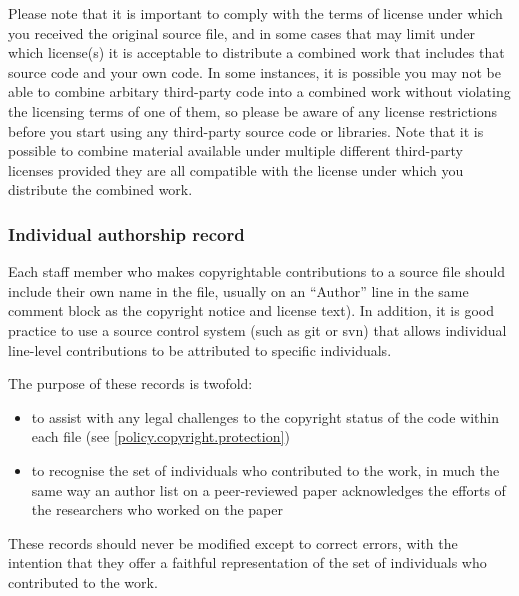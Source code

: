 \documentclass[10pt,a4paper]{article}
\begin{document}
\par Please note that it is important to comply with the terms of license under 
which you received the original source file, and in some cases that may limit 
under which license(s) it is acceptable to distribute a combined work that 
includes that source code and your own code. In some instances, it is possible 
you may not be able to combine arbitary third-party code into a combined work 
without violating the licensing terms of one of them, so please be aware of any 
license restrictions before you start using any third-party source code or libraries. 
Note that it is possible to combine material available under multiple different 
third-party licenses provided they are all compatible \cite{define:compatible} with 
the license under which you distribute the combined work. 



\subsubsection{Individual authorship record}
\label{bestpractice.records}
\par Each staff member who makes copyrightable contributions to a source file 
should include their own name in the file, usually on an ``Author'' line in the 
same comment block as the copyright notice and license text). In addition, it is 
good practice to use a source control system (such as git or svn) that allows 
individual line-level contributions to be attributed to specific individuals. 

\par The purpose of these records is twofold: 
\begin{itemize}
\item to assist with any legal challenges to the copyright status of the code within 
each file (see \ref{policy.copyright.protection})
\item to recognise the set of individuals who contributed to the work, in much the 
same way an author list on a peer-reviewed paper acknowledges the efforts of the 
researchers who worked on the paper
\end{itemize}

\par These records should never be modified except to correct 
errors, with the intention that they offer a faithful representation of the set of 
individuals who contributed to the work. 
\end{document}
